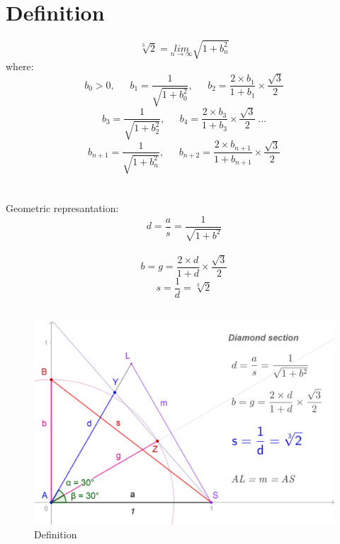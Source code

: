 \documentclass[12pt, letterpaper, oneside]{report}
\begin{document}
\section{Definition}
\begin{equation}
\sqrt[3]{2}= \underset{n\to \infty }{lim} \sqrt{1+b_{n}^{2}}
\end{equation}
where:   
\begin{equation}
b_{0} > 0,\ \hspace{15pt} b_{1}=\dfrac{1}{\sqrt{1+b_{0}^{2}}},\ \hspace{15pt} b_{2}=\frac{2\times b_{1}}{1+b_{1}}\times\frac{\sqrt{3}}{2}
\end{equation}
\vspace{15pt}
\begin{equation}
b_{3}=\dfrac{1}{\sqrt{1+b_{2}^{2}}},\ \hspace{15pt} b_{4}=\frac{2\times b_{3}}{1+b_{3}}\times\frac{\sqrt{3}}{2} \ ...
\end{equation}
\vspace{15pt}
\begin{equation}
b_{n+1}=\dfrac{1}{\sqrt{1+b_{n}^{2}}},\ \hspace{15pt} b_{n+2}=\frac{2\times b_{n+1}}{1+b_{n+1}}\times\frac{\sqrt{3}}{2}
\end{equation}
\\
\ 
\ 
\ 
\\
Geometric represantation:
\begin{equation}
d=\frac{a}{s}=\frac{1}{\sqrt{1+b^{2}}}
\end{equation}
\\
\begin{equation}
 b=g=\frac{2\times d}{1+d}\times\frac{\sqrt{3}}{2}
\end{equation}
\begin{equation}
s=\dfrac{1}{d}=\sqrt[3]{2}
\end{equation}
\\
\begin{figure}[h]
	\centering
	\includegraphics[width=0.7\linewidth]{images/ds_new_def.jpg}
	\caption{Definition}
	\label{fig:definition}
\end{figure} \\
\end{document}
